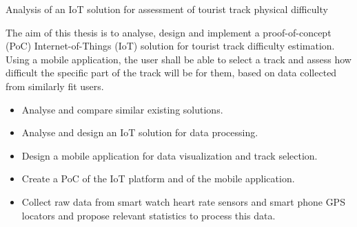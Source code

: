 \linebreak
Analysis of an IoT solution for assessment of tourist track physical difficulty

The aim of this thesis is to analyse, design and implement a proof-of-concept  (PoC) Internet-of-Things (IoT) solution for tourist track difficulty estimation.
Using a mobile application, the user shall be able to select a track and assess how difficult the specific part of the track will be for them, based on data collected from similarly fit users.
\begin{itemize}
    \item Analyse and compare similar existing solutions.
    \item Analyse and design an IoT solution for data processing.
    \item Design a mobile application for data visualization and track selection.
    \item Create a PoC of the IoT platform and of the mobile application.
    \item Collect raw data from smart watch heart rate sensors and smart phone GPS locators and propose relevant statistics to process this data.
\end{itemize}
